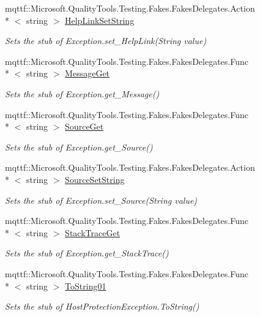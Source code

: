 \begin{DoxyCompactItemize}
mqttf\-::\-Microsoft.\-Quality\-Tools.\-Testing.\-Fakes.\-Fakes\-Delegates.\-Action\\*
$<$ string $>$ \hyperlink{class_system_1_1_security_1_1_fakes_1_1_stub_host_protection_exception_acd34ff0797c3bd4060785e628eab89b3}{Help\-Link\-Set\-String}
\begin{DoxyCompactList}\small\item\em Sets the stub of Exception.\-set\-\_\-\-Help\-Link(\-String value)\end{DoxyCompactList}\item 
mqttf\-::\-Microsoft.\-Quality\-Tools.\-Testing.\-Fakes.\-Fakes\-Delegates.\-Func\\*
$<$ string $>$ \hyperlink{class_system_1_1_security_1_1_fakes_1_1_stub_host_protection_exception_a4a0501ce5471051e22f8c560a76ef5d7}{Message\-Get}
\begin{DoxyCompactList}\small\item\em Sets the stub of Exception.\-get\-\_\-\-Message()\end{DoxyCompactList}\item 
mqttf\-::\-Microsoft.\-Quality\-Tools.\-Testing.\-Fakes.\-Fakes\-Delegates.\-Func\\*
$<$ string $>$ \hyperlink{class_system_1_1_security_1_1_fakes_1_1_stub_host_protection_exception_abf66d3fd92e8326c73788f9723482f8f}{Source\-Get}
\begin{DoxyCompactList}\small\item\em Sets the stub of Exception.\-get\-\_\-\-Source()\end{DoxyCompactList}\item 
mqttf\-::\-Microsoft.\-Quality\-Tools.\-Testing.\-Fakes.\-Fakes\-Delegates.\-Action\\*
$<$ string $>$ \hyperlink{class_system_1_1_security_1_1_fakes_1_1_stub_host_protection_exception_aa78fdf23ac02b0a3aaffebd39f03c3c2}{Source\-Set\-String}
\begin{DoxyCompactList}\small\item\em Sets the stub of Exception.\-set\-\_\-\-Source(\-String value)\end{DoxyCompactList}\item 
mqttf\-::\-Microsoft.\-Quality\-Tools.\-Testing.\-Fakes.\-Fakes\-Delegates.\-Func\\*
$<$ string $>$ \hyperlink{class_system_1_1_security_1_1_fakes_1_1_stub_host_protection_exception_a2b7b5c8fb27b4decc339762d3af81120}{Stack\-Trace\-Get}
\begin{DoxyCompactList}\small\item\em Sets the stub of Exception.\-get\-\_\-\-Stack\-Trace()\end{DoxyCompactList}\item 
mqttf\-::\-Microsoft.\-Quality\-Tools.\-Testing.\-Fakes.\-Fakes\-Delegates.\-Func\\*
$<$ string $>$ \hyperlink{class_system_1_1_security_1_1_fakes_1_1_stub_host_protection_exception_a2c2c5a2f0823cba9eaa072eb100a7042}{To\-String01}
\begin{DoxyCompactList}\small\item\em Sets the stub of Host\-Protection\-Exception.\-To\-String()\end{DoxyCompactList}\end{DoxyCompactItemize}

